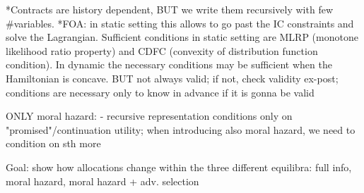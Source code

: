 *Contracts are history dependent, BUT we write them recursively with few #variables.
*FOA: in static setting this allows to go past the IC constraints and solve the Lagrangian. Sufficient conditions in static setting are MLRP (monotone likelihood ratio property) and CDFC (convexity of distribution function condition). In dynamic the necessary conditions may be sufficient when the Hamiltonian is concave.
    BUT not always valid; if not, check validity ex-post; conditions are necessary only to know in advance if it is gonna be valid




ONLY moral hazard:
- recursive representation conditions only on "promised"/continuation utility; when introducing also moral hazard, we need to condition on sth more






Goal: show how allocations change within the three different equilibra: full info, moral hazard, moral hazard + adv. selection 